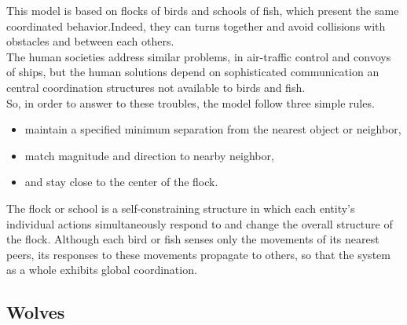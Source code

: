 This model is based on flocks of birds and schools of fish, which present the same coordinated behavior.Indeed, they can turns together and avoid collisions with obstacles and between each others.\\

The human societies address similar problems, in air-traffic control and convoys of ships, but the human solutions depend on sophisticated communication an central coordination structures not available to birds and fish.\\

So, in order to answer to these troubles, the model follow three simple rules.
\begin{itemize}
\item maintain a specified minimum separation from the nearest object or neighbor,
\item match magnitude and direction to nearby neighbor,
\item and stay close to the center of the flock.
\end{itemize}

The flock or school is a self-constraining structure in which each entity’s individual
actions simultaneously respond to and change the overall structure of the flock. Although each bird or fish senses only the movements of its nearest peers, its responses to these movements propagate to others, so that the system as a whole exhibits global coordination.

\subsection{Wolves}

